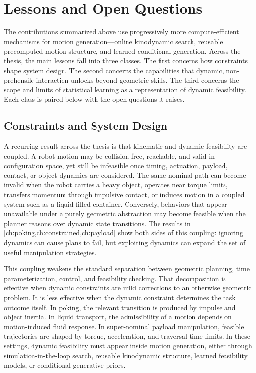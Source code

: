 \section{Lessons and Open Questions}
\label{sec:discussion:lessons}

The contributions summarized above use progressively more compute-efficient mechanisms for motion generation---online kinodynamic search, reusable precomputed motion structure, and learned conditional generation.
Across the thesis, the main lessons fall into three classes.
The first concerns how constraints shape system design.
The second concerns the capabilities that dynamic, non-prehensile interaction unlocks beyond geometric skills.
The third concerns the scope and limits of statistical learning as a representation of dynamic feasibility.
Each class is paired below with the open questions it raises.

\subsection{Constraints and System Design}
\label{sec:discussion:constraints}

A recurring result across the thesis is that kinematic and dynamic feasibility are coupled.
A robot motion may be collision-free, reachable, and valid in configuration space, yet still be infeasible once timing, actuation, payload, contact, or object dynamics are considered.
The same nominal path can become invalid when the robot carries a heavy object, operates near torque limits, transfers momentum through impulsive contact, or induces motion in a coupled system such as a liquid-filled container.
Conversely, behaviors that appear unavailable under a purely geometric abstraction may become feasible when the planner reasons over dynamic state transitions.
The results in \cref{ch:poking,ch:constrained,ch:payload} show both sides of this coupling: ignoring dynamics can cause plans to fail, but exploiting dynamics can expand the set of useful manipulation strategies.

This coupling weakens the standard separation between geometric planning, time parameterization, control, and feasibility checking.
That decomposition is effective when dynamic constraints are mild corrections to an otherwise geometric problem.
It is less effective when the dynamic constraint determines the task outcome itself.
In poking, the relevant transition is produced by impulse and object inertia.
In liquid transport, the admissibility of a motion depends on motion-induced fluid response.
In super-nominal payload manipulation, feasible trajectories are shaped by torque, acceleration, and traversal-time limits.
In these settings, dynamic feasibility must appear inside motion generation, either through simulation-in-the-loop search, reusable kinodynamic structure, learned feasibility models, or conditional generative priors.

